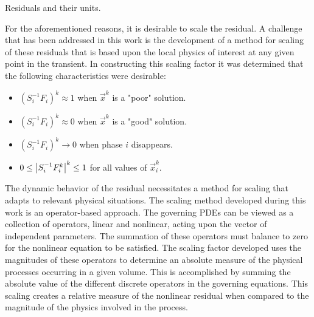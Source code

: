 \begin{table}[ht!]
\centering
\singlespace

\caption{Residuals and their units.}
\label{tab:scaling_units_scales}
\end{table}

For the aforementioned reasons, it is desirable to scale the residual.
A challenge that has been addressed in this work is the development of a method for scaling of these residuals that is based upon the local physics of interest at any given point in the transient.
In constructing this scaling factor it was determined that the following characteristics were desirable:

\begin{itemize}
\item{$(S_{i}^{-1} F_i)^{k} \approx 1$ when $\vec{x}^{k}$ is a "poor" solution.}
\item{$(S_{i}^{-1} F_i)^{k} \approx 0$ when $\vec{x}^{k}$ is a "good" solution.}
\item{$(S_{i}^{-1} F_i)^{k} \rightarrow 0$ when phase $i$ disappears.}
\item{$0 \leq \left|S_{i}^{-1} F^{k}_{i}\right|^{k} \leq 1 $ for all values of $\vec{x}^{k}_i$.}
\end{itemize}

The dynamic behavior of the residual necessitates a method for scaling that adapts to relevant physical situations.
The scaling method developed during this work is an operator-based approach.
The governing PDEs can be viewed as a collection of operators, linear and nonlinear, acting upon the vector of independent parameters.
The summation of these operators must balance to zero for the nonlinear equation to be satisfied.
The scaling factor developed uses the magnitudes of these operators to determine an absolute measure of the physical processes occurring in a given volume.
This is accomplished by summing the absolute value of the different discrete operators in the governing equations.
This scaling creates a relative measure of the nonlinear residual when compared to the magnitude of the physics involved in the process.

